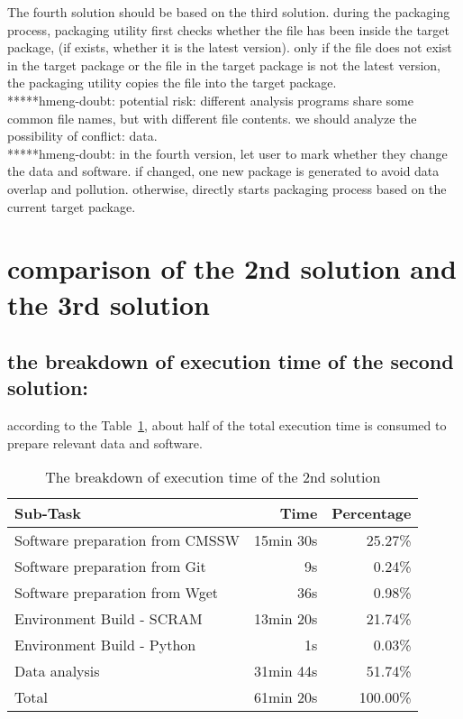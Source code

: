\documentclass{article}
\begin{document}
The fourth solution should be based on the third solution. during the packaging process, packaging utility first checks whether the file has been inside the target package, (if exists, whether it is the latest version). only if the file does not exist in the target package or the file in the target package is not the latest version, the packaging utility copies the file into the target package.\\

*****hmeng-doubt: potential risk: different analysis programs share some common file names, but with different file contents. we should analyze the possibility of conflict: data.\\

*****hmeng-doubt: in the fourth version, let user to mark whether they change the data and software. if changed, one new package is generated to avoid data overlap and pollution. otherwise, directly starts packaging process based on the current target package. 

\section{comparison of the 2nd solution and the 3rd solution}
\subsection{the breakdown of execution time of the second solution: }
\indent according to the Table~\ref{table:time-2nd}, about half of the total execution time is consumed to prepare relevant data and software.

\begin{table}
    \centering
    \begin{tabular}{|l|r|r|}
    \hline
    Sub-Task & Time & Percentage \\ \hline
    Software preparation from CMSSW & 15min 30s & 25.27\% \\ \hline
    Software preparation from Git & 9s & 0.24\% \\ \hline
    Software preparation from Wget & 36s & 0.98\% \\ \hline
    Environment Build - SCRAM & 13min 20s & 21.74\% \\ \hline
    Environment Build - Python & 1s & 0.03\% \\ \hline
    Data analysis & 31min 44s & 51.74\% \\ \hline
    Total & 61min 20s & 100.00\% \\ \hline
    \end{tabular}
    \caption{The breakdown of execution time of the 2nd solution}
    \label{table:time-2nd}
\end{table}
\end{document}
